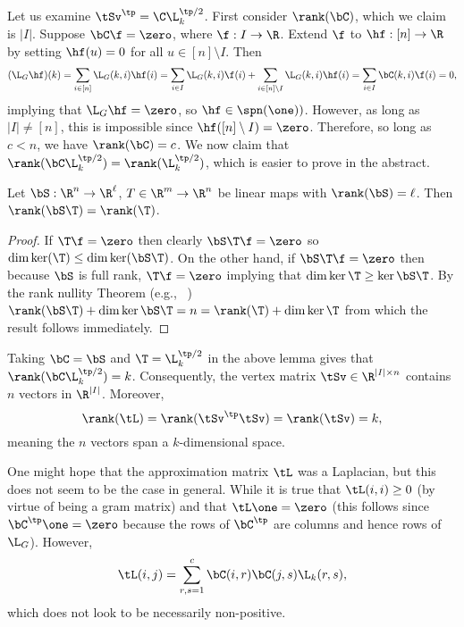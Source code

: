Let us examine $\tSv^\tp=\C\L_k^{\tp/2}$. First consider $\rank(\bC)$, which we claim is $|I|$. Suppose $\bC\f=\zero$, where $\f:I \to \R$. Extend $\f$ to $\hf:[n]\to\R$ by setting $\hf(u)=0$ for all $u\in [n]\setminus I$. Then 
\[(\L_G\hf)(k) = \sum_{i\in[n]}\L_G(k,i)\hf(i) = \sum_{i\in I}\L_G(k,i) \f(i) + \sum_{i\in[n]\setminus I} \L_G(k,i)\hf(i) = \sum_{i\in I}\bC(k,i) \f(i) = 0,\]
implying that $\L_G\hf=\zero$, so $\hf\in\spn(\one))$. However, as long as $|I|\neq[n]$, this is impossible since  $\hf([n]\setminus I)=\zero$. Therefore, so long as $c<n$, we have $\rank(\bC) = c$. 
We now claim that $\rank(\bC\L_k^{\tp/2}) = \rank(\L_k^{\tp/2})$, which is easier to prove in the abstract. 

\begin{lemma}
	Let $\bS:\R^n\to\R^\ell$, $T\in\R^m\to\R^n$ be linear maps with $\rank(\bS)=\ell$. Then $\rank(\bS\T) = \rank(\T)$. 
\end{lemma}
\begin{proof}
	If $\T\f=\zero$ then clearly $\bS\T\f=\zero$ so $\dim\ker(\T)\leq \dim\ker(\bS\T)$. On the other hand, if $\bS\T\f=\zero$ then because $\bS$ is full rank, $\T\f=\zero$ implying that $\dim \ker \T\ge \ker\bS\T$. 	By the rank nullity Theorem (e.g., ~\cite{axler1997linear}) $\rank(\bS\T) + \dim\ker \bS\T = n = \rank(\T) + \dim\ker\T$ from which the result follows immediately. 
\end{proof}

Taking $\bC=\bS$ and $\T=\L_k^{\tp/2}$ in the above lemma gives that $\rank(\bC\L_k^{\tp/2})=k$. Consequently, the vertex matrix $\tSv\in\R^{|I|\times n}$ contains $n$ vectors in $\R^{|I|}$. Moreover, 
\[\rank(\tL) = \rank(\tSv^\tp \tSv) = \rank(\tSv)=k,\]
meaning the $n$ vectors span a $k$-dimensional space. 

One might hope that the approximation matrix $\tL$ was a Laplacian, but this does not seem to be the case in general. While it is true that $\tL(i,i)\geq 0$ (by virtue of being a gram matrix) and that $\tL\one=\zero$ (this follows since $\bC^\tp\one =\zero$ because the rows of $\bC^\tp$ are columns and hence rows of $\L_G$). However, 
\[\tL(i,j) = \sum_{r,s=1}^c \bC(i,r)\bC(j,s)\L_k(r,s),\]
which does not look to be necessarily non-positive. 






